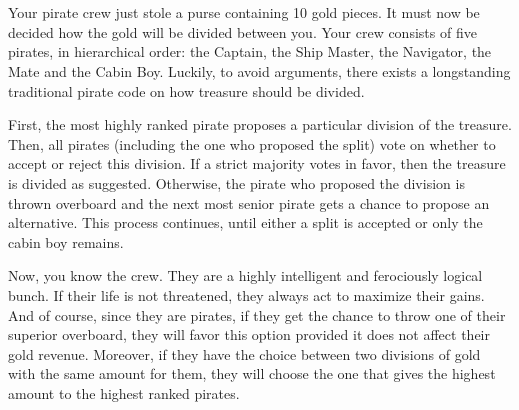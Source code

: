\documentclass{ape}
\begin{document}
\begin{center}
{
}
\end{center}

\nosolution

\section{}
Your pirate crew just stole a purse containing 10 gold pieces. It must now be decided how the gold will be divided between you. Your crew consists of five pirates, in hierarchical order: the Captain, the Ship Master, the Navigator, the Mate and the Cabin Boy. Luckily, to avoid arguments, there exists a longstanding traditional pirate code on how treasure should be divided.

First, the most highly ranked pirate proposes a particular division of the treasure. Then, all pirates (including the one who proposed the split) vote on whether to accept or reject this division. If a strict majority votes in favor, then the treasure is divided as suggested. Otherwise, the pirate who proposed the division is thrown overboard and the next most senior pirate gets a chance to propose an alternative. This process continues, until either a split is accepted or only the cabin boy remains.

Now, you know the crew. They are a highly intelligent and ferociously logical bunch. If their life is not threatened, they always act to maximize their gains. And of course, since they are pirates, if they get the chance to throw one of their superior overboard, they will favor this option provided it does not affect their gold revenue.
Moreover, if they have the choice between two divisions of gold with the same amount for them, they will choose the one that gives the highest amount to the highest ranked pirates.
\end{document}

